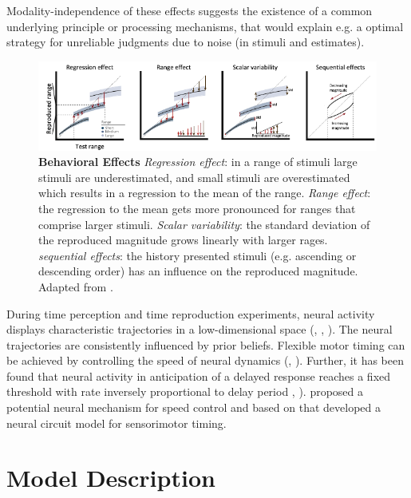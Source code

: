 \documentclass[9pt]{article}
\begin{document}
Modality-independence of these effects suggests the existence of a common underlying principle or processing mechanisms, that would explain e.g. a optimal strategy for unreliable judgments due to noise (in stimuli and estimates).

\begin{figure}[h]
	\centering
	\includegraphics{figures/behavioural_effects_petzschner.pdf}
	\caption{\textbf{Behavioral Effects} 
	\textit{Regression effect}: in a range of stimuli large stimuli are underestimated, and small stimuli are overestimated which results in a regression to the mean of the range.
	\textit{Range effect}: the regression to the mean gets more pronounced for ranges that comprise larger stimuli. 
	\textit{Scalar variability}: the standard deviation of the reproduced magnitude grows linearly with larger rages. 
	\textit{sequential effects}: the history presented stimuli (e.g. ascending or descending order) has an influence on the reproduced magnitude. 
	Adapted from \cite{Petzschner2015}.}
\label{fig:behavioraleffects}
\end{figure}

During time perception and time reproduction experiments, neural activity displays characteristic trajectories in a low-dimensional space (\cite{Meirhaeghe2021}, \cite{Wang2018}, \cite{Henke2021}). 
The neural trajectories are consistently influenced by prior beliefs. 
Flexible motor timing can be achieved by controlling the speed of neural dynamics (\cite{Sohn2019}, \cite{Wang2018}). 
Further, it has been found that neural activity in anticipation of a delayed response reaches a fixed threshold with rate inversely proportional to delay period \cite{Murakami2014}, \cite{Mita2009}).
\cite{Wang2018} proposed a potential neural mechanism for speed control and based on that \cite{Egger2020} developed a neural circuit model for sensorimotor timing.

\section{Model Description}
\end{document}
